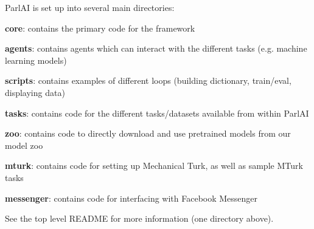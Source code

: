 Parl\+AI is set up into several main directories\+:


\begin{DoxyItemize}
\item {\bfseries core}\+: contains the primary code for the framework
\item {\bfseries agents}\+: contains agents which can interact with the different tasks (e.\+g. machine learning models)
\item {\bfseries scripts}\+: contains examples of different loops (building dictionary, train/eval, displaying data)
\item {\bfseries tasks}\+: contains code for the different tasks/datasets available from within Parl\+AI
\item {\bfseries zoo}\+: contains code to directly download and use pretrained models from our model zoo
\item {\bfseries mturk}\+: contains code for setting up Mechanical Turk, as well as sample M\+Turk tasks
\item {\bfseries messenger}\+: contains code for interfacing with Facebook Messenger
\end{DoxyItemize}

See the top level R\+E\+A\+D\+ME for more information (one directory above). 